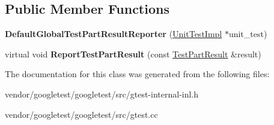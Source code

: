 \subsection*{Public Member Functions}
\begin{DoxyCompactItemize}
\item 
\mbox{\label{classtesting_1_1internal_1_1_default_global_test_part_result_reporter_a3900ea7f34b34afd48c7d1d0312a1488}} 
{\bfseries Default\+Global\+Test\+Part\+Result\+Reporter} (\hyperlink{classtesting_1_1internal_1_1_unit_test_impl}{Unit\+Test\+Impl} $\ast$unit\+\_\+test)
\item 
\mbox{\label{classtesting_1_1internal_1_1_default_global_test_part_result_reporter_a6081576a23b964cfecab1e424d8044fc}} 
virtual void {\bfseries Report\+Test\+Part\+Result} (const \hyperlink{classtesting_1_1_test_part_result}{Test\+Part\+Result} \&result)
\end{DoxyCompactItemize}


The documentation for this class was generated from the following files\+:\begin{DoxyCompactItemize}
\item 
vendor/googletest/googletest/src/gtest-\/internal-\/inl.\+h\item 
vendor/googletest/googletest/src/gtest.\+cc\end{DoxyCompactItemize}

